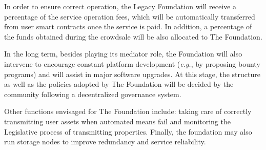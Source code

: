 In order to ensure correct operation, the Legacy Foundation will receive a percentage of the service operation fees, which will be automatically transferred from user smart contracts once the service is paid. In addition, a percentage of the funds obtained during the crowdsale will be also allocated to The Foundation.

In the long term, besides playing its mediator role, the Foundation will also intervene to encourage constant platform development (\textit{e.g.}, by proposing bounty programs) and will assist in major software upgrades.
At this stage, the structure as well as the policies adopted by The Foundation will be decided by the community following a decentralized governance system.

Other functions envisaged for The Foundation include: 
taking care of correctly transmitting user assets when automated means fail and monitoring the Legislative process of transmitting properties.
Finally, the foundation may also run storage nodes to improve redundancy and service reliability.


